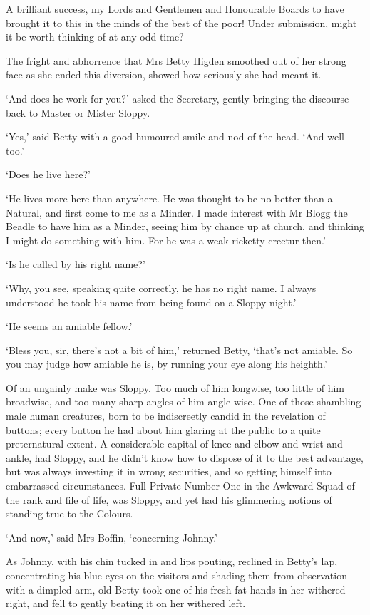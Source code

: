 A brilliant success, my Lords and Gentlemen and Honourable Boards to
have brought it to this in the minds of the best of the poor! Under
submission, might it be worth thinking of at any odd time?

The fright and abhorrence that Mrs Betty Higden smoothed out of her
strong face as she ended this diversion, showed how seriously she had
meant it.

‘And does he work for you?’ asked the Secretary, gently bringing the
discourse back to Master or Mister Sloppy.

‘Yes,’ said Betty with a good-humoured smile and nod of the head. ‘And
well too.’

‘Does he live here?’

‘He lives more here than anywhere. He was thought to be no better than a
Natural, and first come to me as a Minder. I made interest with Mr Blogg
the Beadle to have him as a Minder, seeing him by chance up at church,
and thinking I might do something with him. For he was a weak ricketty
creetur then.’

‘Is he called by his right name?’

‘Why, you see, speaking quite correctly, he has no right name. I always
understood he took his name from being found on a Sloppy night.’

‘He seems an amiable fellow.’

‘Bless you, sir, there’s not a bit of him,’ returned Betty, ‘that’s not
amiable. So you may judge how amiable he is, by running your eye along
his heighth.’

Of an ungainly make was Sloppy. Too much of him longwise, too little of
him broadwise, and too many sharp angles of him angle-wise. One of those
shambling male human creatures, born to be indiscreetly candid in the
revelation of buttons; every button he had about him glaring at the
public to a quite preternatural extent. A considerable capital of knee
and elbow and wrist and ankle, had Sloppy, and he didn’t know how to
dispose of it to the best advantage, but was always investing it in
wrong securities, and so getting himself into embarrassed circumstances.
Full-Private Number One in the Awkward Squad of the rank and file of
life, was Sloppy, and yet had his glimmering notions of standing true to
the Colours.

‘And now,’ said Mrs Boffin, ‘concerning Johnny.’

As Johnny, with his chin tucked in and lips pouting, reclined in Betty’s
lap, concentrating his blue eyes on the visitors and shading them from
observation with a dimpled arm, old Betty took one of his fresh fat
hands in her withered right, and fell to gently beating it on her
withered left.

